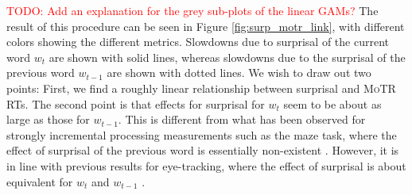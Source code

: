 \documentclass[12pt]{article}
\newcommand{\motr}{\textsc{MoTR}\xspace}
\newcommand{\todo}[1]{\textcolor{red}{ TODO: #1 }}
\begin{document}
{\todo{Add an explanation for the grey sub-plots of the linear GAMs?}The result of this procedure can be seen in Figure \ref{fig:surp_motr_link}, with different colors showing the different metrics. Slowdowns due to surprisal of the current word $w_t$ are shown with solid lines, whereas slowdowns due to the surprisal of the previous word $w_{t-1}$ are shown with dotted lines. We wish to draw out two points: First, we find a roughly linear relationship between surprisal and \motr RTs. The second point is that effects for surprisal for $w_t$ seem to be about as large as those for $w_{t-1}$. This is different from what has been observed for strongly incremental processing measurements such as the maze task, where the effect of surprisal of the previous word is essentially non-existent \citep{boyce2020stories}. However, it is in line with previous results for eye-tracking, where the effect of surprisal is about equivalent for $w_t$ and $w_{t-1}$ \citep{smith2013effect}.


}
\end{document}
